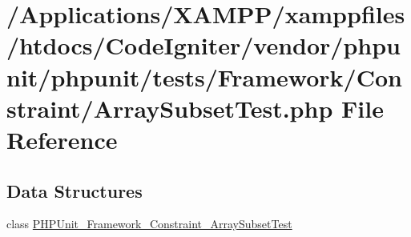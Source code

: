 \hypertarget{_array_subset_test_8php}{}\section{/\+Applications/\+X\+A\+M\+P\+P/xamppfiles/htdocs/\+Code\+Igniter/vendor/phpunit/phpunit/tests/\+Framework/\+Constraint/\+Array\+Subset\+Test.php File Reference}
\label{_array_subset_test_8php}
\subsection*{Data Structures}
\begin{DoxyCompactItemize}
\item 
class \mbox{\hyperlink{class_p_h_p_unit___framework___constraint___array_subset_test}{P\+H\+P\+Unit\+\_\+\+Framework\+\_\+\+Constraint\+\_\+\+Array\+Subset\+Test}}
\end{DoxyCompactItemize}

